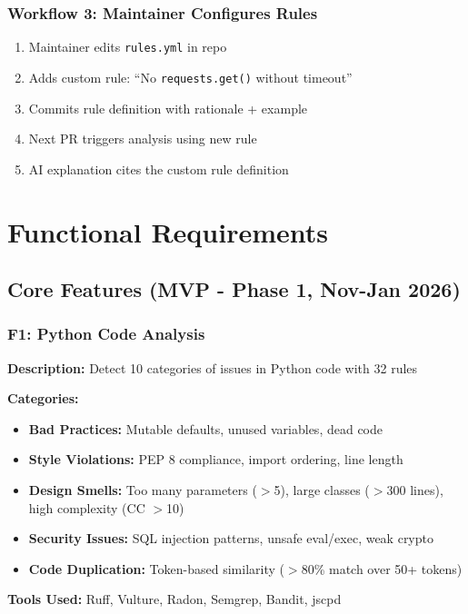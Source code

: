 \documentclass[11pt,a4paper]{article}
\begin{document}
\subsubsection{Workflow 3: Maintainer Configures Rules}
\begin{enumerate}
    \item Maintainer edits \texttt{rules.yml} in repo
    \item Adds custom rule: ``No \texttt{requests.get()} without timeout''
    \item Commits rule definition with rationale + example
    \item Next PR triggers analysis using new rule
    \item AI explanation cites the custom rule definition
\end{enumerate}

\section{Functional Requirements}

\subsection{Core Features (MVP - Phase 1, Nov-Jan 2026)}

\subsubsection{F1: Python Code Analysis}
\textbf{Description:} Detect 10 categories of issues in Python code with 32 rules

\textbf{Categories:}
\begin{itemize}[leftmargin=*]
    \item \textbf{Bad Practices:} Mutable defaults, unused variables, dead code
    \item \textbf{Style Violations:} PEP 8 compliance, import ordering, line length
    \item \textbf{Design Smells:} Too many parameters ($>$5), large classes ($>$300 lines), high complexity (CC $>$10)
    \item \textbf{Security Issues:} SQL injection patterns, unsafe eval/exec, weak crypto
    \item \textbf{Code Duplication:} Token-based similarity ($>$80\% match over 50+ tokens)
\end{itemize}

\textbf{Tools Used:} Ruff, Vulture, Radon, Semgrep, Bandit, jscpd
\end{document}
